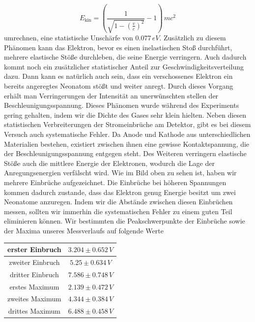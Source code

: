 \documentclass[a4paper, 12pt]{scrartcl}
\begin{document}
\begin{equation*}E_\text{kin}=\left(\frac{1}{\sqrt{1-\left(\frac{v}{c}\right)^2}}-1\right)\,mc^2\end{equation*}
umrechnen, eine statistische Unschärfe von $0.077\,eV$. Zusätzlich zu diesem Phänomen kann das Elektron, bevor es einen inelastischen Stoß durchführt, mehrere elastische Stöße durchleben, die seine Energie verringern. Auch dadurch kommt noch ein zusätzlicher statistischer Anteil zur Geschwindigkeitsverteilung dazu. Dann kann es natürlich auch sein, dass ein verschossenes Elektron ein bereits angeregtes Neonatom stößt und weiter anregt. Durch dieses Vorgang erhält man Verringerungen der Intensität an unerwünschten stellen der Beschleunigungsspannung. Dieses Phänomen wurde während des Experiments gering gehalten, indem wir die Dichte des Gases sehr klein hielten.\newline
Neben diesen statistischen Verbreiterungen der Stromeinbrüche am Detektor, gibt es bei diesem Versuch auch systematische Fehler. Da Anode und Kathode aus unterschiedlichen Materialien bestehen, existiert zwischen ihnen eine gewisse Kontaktspannung, die der Beschleunigungsspannung entgegen steht. Des Weiteren verringern elastische Stöße auch die mittlere Energie der Elektronen, wodurch die Lage der Anregungsenergien verfälscht wird. Wie im Bild oben zu sehen ist, haben wir mehrere Einbrüche aufgezeichnet. Die Einbrüche bei höheren Spannungen kommen dadurch zustande, dass das Elektron genug Energie besitzt um zwei Neonatome anzuregen. Indem wir die Abstände zwischen diesen Einbrüchen messen, sollten wir immerhin die systematischen Fehler zu einem guten Teil eliminieren können. Wir bestimmten die Peakschwerpunkte der Einbrüche  sowie der Maxima unseres Messverlaufs auf folgende Werte
\begin{table}[H]\begin{tabular}{c | c}erster Einbruch&$3.204\pm0.652\,V$\\\hline
zweiter Einbruch&$5.25\pm0.634\,V$\\\hline
dritter Einbruch&$7.586\pm0.748\,V$\\\hline
erstes Maximum&$2.139\pm0.472\,V$\\\hline
zweites Maximum&$4.344\pm0.384\,V$\\\hline
drittes Maximum&$6.488\pm0.458\,V$
\end{tabular}\end{table}
\end{document}
